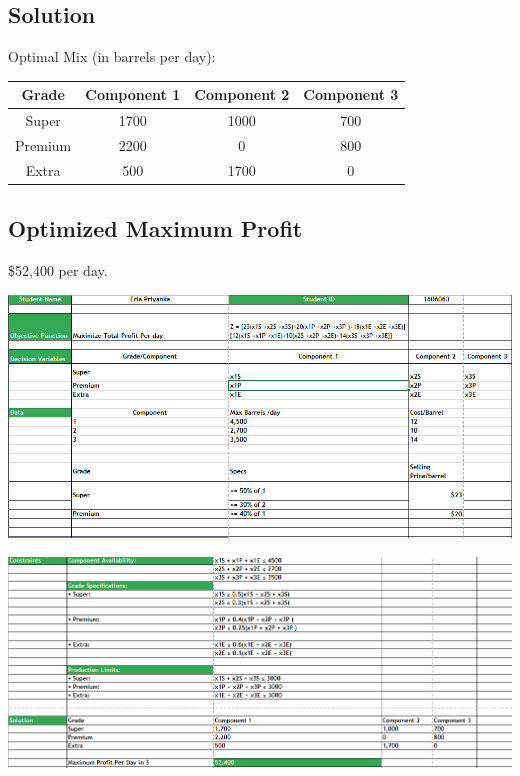 \documentclass[10pt]{article}
\begin{document}
\subsection*{Solution}
Optimal Mix (in barrels per day):

\begin{tabular}{|c|c|c|c|}
\hline
Grade & Component 1 & Component 2 & Component 3 \\
\hline
Super & 1700 & 1000 & 700 \\
Premium & 2200 & 0 & 800 \\
Extra & 500 & 1700 & 0 \\
\hline
\end{tabular}

\subsection*{Optimized Maximum Profit}
\$52,400 per day.

\begin{center}
    \includegraphics[width=\textwidth]{Q1.PNG} 
\end{center} 
\vspace{30pt}

\begin{center}
    \includegraphics[width=\textwidth]{Q12.PNG} 
\end{center} 
\end{document}
